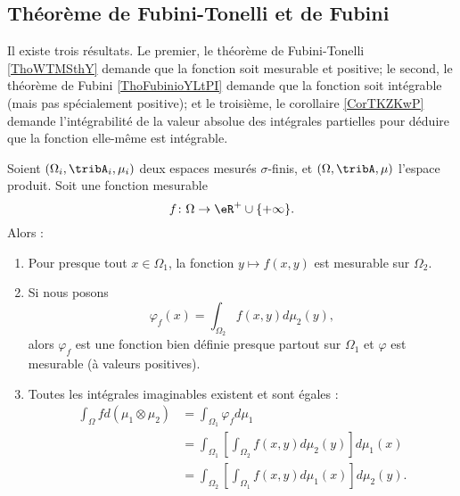\subsection{Théorème de Fubini-Tonelli et de Fubini}

Il existe trois résultats. Le premier, le théorème de Fubini-Tonelli \ref{ThoWTMSthY} demande que la fonction soit mesurable et positive; le second, le théorème de Fubini \ref{ThoFubinioYLtPI} demande que la fonction soit intégrable (mais pas spécialement positive); et le troisième, le corollaire \ref{CorTKZKwP} demande l'intégrabilité de la valeur absolue des intégrales partielles pour déduire que la fonction elle-même est intégrable.


\begin{theorem}\label{ThoWTMSthY}
    Soient \( (\Omega_i,\tribA_i,\mu_i)\) deux espaces mesurés \( \sigma\)-finis, et \( (\Omega,\tribA,\mu)\) l'espace produit. Soit une fonction mesurable
    \begin{equation}
        f\colon \Omega\to \eR^{+}\cup\{ +\infty \}.
    \end{equation}
    Alors :
    \begin{enumerate}
        \item
            Pour presque tout \( x\in\Omega_1\), la fonction \( y\mapsto f(x,y)\) est mesurable sur \( \Omega_2\).
        \item
            Si nous posons
            \begin{equation}
                \varphi_f(x)=\int_{\Omega_2}f(x,y)d\mu_2(y),
            \end{equation}
            alors \( \varphi_f\) est une fonction bien définie presque partout sur \( \Omega_1\) et \( \varphi\) est mesurable (à valeurs positives).
        \item
            Toutes les intégrales imaginables existent et sont égales :
            \begin{subequations}
                \begin{align}
                \int_{\Omega}fd(\mu_1\otimes \mu_2)&=\int_{\Omega_1}\varphi_fd\mu_1\\
                &=\int_{\Omega_1}\left[ \int_{\Omega_2}f(x,y)d\mu_2(y) \right]d\mu_1(x)\\
                &=\int_{\Omega_2}\left[ \int_{\Omega_1}f(x,y)d\mu_1(x) \right]d\mu_2(y).
                \end{align}
            \end{subequations}
    \end{enumerate}
\end{theorem}

